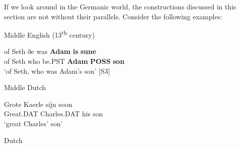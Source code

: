 
If we look around in the Germanic world, the constructions discussed in this section are not without their parallels. Consider the following examples: 


\item 

\label{bkm:Ref126571184}Middle English (13\textsuperscript{th} century)



 \ea\label{}
\gll of  Seth  ðe  was  \textbf{Adam} \textbf{is} \textbf{sune}\\


of  Seth  who  be.PST  \textbf{Adam} \textbf{POSS} \textbf{son}\\

\glt ‘of Seth, who was Adam’s son’ [S3]

\z

\item 

\label{bkm:Ref151373829}Middle Dutch



 \ea\label{}
\gll Grote  Kaerle  sijn  soon\\


Great.DAT  Charles.DAT  his  son\\

\glt ‘great Charles’ son’

\z

\item 

Dutch


